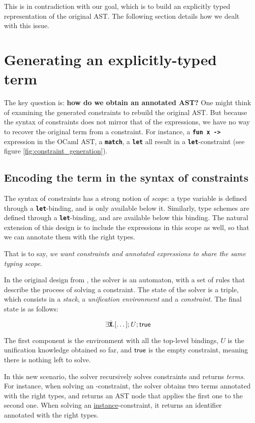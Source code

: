\documentclass[10pt,a4paper,twoside,titlepage,twocolumn]{article}
\newcommand{\code}[1]{\textbf{\texttt{#1}}}
\begin{document}
This is in contradiction with our goal, which is to build an explicitly typed
representation of the original AST. The following section details how we dealt
with this issue.

\section{Generating an explicitly-typed term}

The key question is: \textbf{how do we obtain an annotated AST?} One might think
of examining the generated constraints to rebuild the original AST. But because
the syntax of constraints does not mirror that of the expressions, we have no
way to recover the original term from a constraint. For instance, a \code{fun x
->} expression in the OCaml AST, a \code{match}, a \code{let}
all result in a \code{let}-constraint (see figure
\vref{fig:constraint_generation}).

\subsection{Encoding the term in the syntax of constraints}

The syntax of constraints has a strong notion of \emph{scope}: a type variable is
defined through a \code{let}-binding, and is only available below it. Similarly,
type schemes are defined through a \code{let}-binding, and are available below
this binding. The natural extension of this design is to include the expressions
in this scope as well, so that we can annotate them with the right types.

That is to say, \emph{we want constraints and annotated expressions to share the
same typing scope}.

In the original design from \cite{pottier2005essence}, the solver is an
automaton, with a set of rules that describe the process of solving a
constraint. The state of the solver is a triple, which consists in a
\emph{stack}, a \emph{unification environment} and a \emph{constraint}. The
final state is as follows:

$$\cexists\tvars[\dots]; U; \ctrue$$

The first component is the environment with all the top-level bindings, $U$ is
the unification knowledge obtained so far, and $\text{\textsf{true}}$ is the empty constraint,
meaning there is nothing left to solve.

In this new scenario, the solver recursively solves constraints and returns
\emph{terms}. For instance, when solving an
\underline{}-constraint, the solver obtains two terms
annotated with the right types, and returns an AST node that applies the first
one to the second one. When solving an \underline{instance}-constraint, it
returns an identifier annotated with the right types. 
\end{document}
